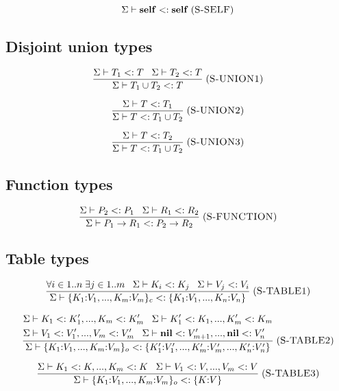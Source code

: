 \documentclass[12pt]{article}
\newcommand{\Nil}{\mathbf{nil}}
\newcommand{\Self}{\mathbf{self}}
\newcommand{\mylabel}[1]{\; (\textsc{#1})}
\newcommand{\subtype}{<:}
\newcommand{\senv}{\Sigma}
\begin{document}
\[
\senv \vdash \Self \subtype \Self
\mylabel{S-SELF}
\]

\subsection{Disjoint union types}

\[
\frac{\senv \vdash T_{1} \subtype T \;\;\;
      \senv \vdash T_{2} \subtype T}
     {\senv \vdash T_{1} \cup T_{2} \subtype T}
\mylabel{S-UNION1}
\]

\[
\frac{\senv \vdash T \subtype T_{1}}
     {\senv \vdash T \subtype T_{1} \cup T_{2}}
\mylabel{S-UNION2}
\]

\[
\frac{\senv \vdash T \subtype T_{2}}
     {\senv \vdash T \subtype T_{1} \cup T_{2}}
\mylabel{S-UNION3}
\]

\subsection{Function types}

\[
\frac{\senv \vdash P_{2} \subtype P_{1} \;\;\;
      \senv \vdash R_{1} \subtype R_{2}}
     {\senv \vdash P_{1} \rightarrow R_{1} \subtype P_{2} \rightarrow R_{2}}
\mylabel{S-FUNCTION}
\]

\subsection{Table types}

\[
\frac{\forall i \in 1..n \; \exists j \in 1..m \;\;\;
      \senv \vdash K_{i} \subtype K_{j} \;\;\;
      \senv \vdash V_{j} \subtype V_{i}}
     {\senv \vdash \{K_{1}{:}V_{1}, ..., K_{m}{:}V_{m}\}_{c} \subtype \{K_{1}{:}V_{1}, ..., K_{n}{:}V_{n}\}}
\mylabel{S-TABLE1}
\]

\[
\frac{\begin{aligned}
      & \senv \vdash K_{1} \subtype K_{1}', ..., K_{m} \subtype K_{m}' \;\;\;
      \senv \vdash K_{1}' \subtype K_{1}, ..., K_{m}' \subtype K_{m}\\
      & \senv \vdash V_{1} \subtype V_{1}', ..., V_{m} \subtype V_{m}'\;\;\;
      \senv \vdash \Nil \subtype V_{m+1}', ..., \Nil \subtype V_{n}'
      \end{aligned}}
     {\senv \vdash \{K_{1}{:}V_{1}, ..., K_{m}{:}V_{m}\}_{o} \subtype \{K_{1}'{:}V_{1}', ..., K_{m}'{:}V_{m}', ..., K_{n}'{:}V_{n}'\}}
\mylabel{S-TABLE2}
\]

\[
\frac{\senv \vdash K_{1} \subtype K, ..., K_{m} \subtype K \;\;\;
      \senv \vdash V_{1} \subtype V, ..., V_{m} \subtype V}
     {\senv \vdash \{K_{1}{:}V_{1}, ..., K_{m}{:}V_{m}\}_{o} \subtype \{K{:}V\}} 
\mylabel{S-TABLE3}
\]
\end{document}
